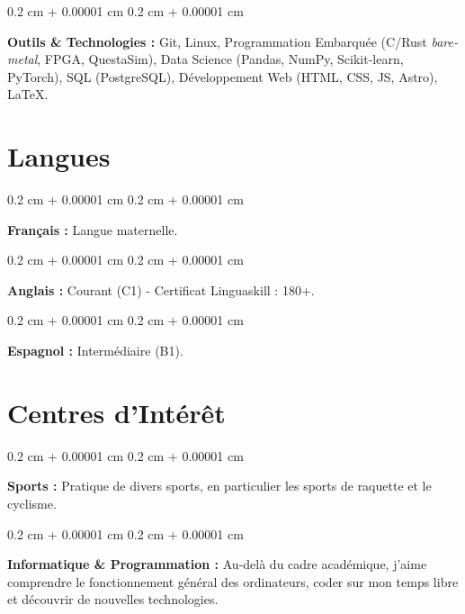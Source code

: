 \documentclass[10pt, a4]{article}
\newenvironment{onecolentry}{
    \begin{adjustwidth}{
        0.2 cm + 0.00001 cm
    }{
        0.2 cm + 0.00001 cm
    }
}{
    \end{adjustwidth}
} %
\begin{document}
        \vspace{0.2 cm}

        \begin{onecolentry}
            \textbf{Outils \& Technologies :} Git, Linux, Programmation
            Embarquée (C/Rust \textit{bare-metal}, FPGA, QuestaSim), Data
            Science (Pandas, NumPy, Scikit-learn, PyTorch), SQL (PostgreSQL),
            Développement Web (HTML, CSS, JS, Astro), \LaTeX.
        \end{onecolentry}


    \section{Langues}

        \begin{onecolentry}
            \textbf{Français :} Langue maternelle.
        \end{onecolentry}

        \vspace{0.2 cm}

        \begin{onecolentry}
            \textbf{Anglais :} Courant (C1) - Certificat Linguaskill : 180+.
        \end{onecolentry}

        \vspace{0.2 cm}

        \begin{onecolentry}
            \textbf{Espagnol :} Intermédiaire (B1).
        \end{onecolentry}


    \section{Centres d'Intérêt}

        \begin{onecolentry}
            \textbf{Sports :} Pratique de divers sports, en particulier les
            sports de raquette et le cyclisme.
        \end{onecolentry}

        \vspace{0.2 cm}

        \begin{onecolentry}
            \textbf{Informatique \& Programmation :} Au-delà du cadre
            académique, j'aime comprendre le fonctionnement général des
            ordinateurs, coder sur mon temps libre et découvrir de nouvelles
            technologies.
        \end{onecolentry}
\end{document}
